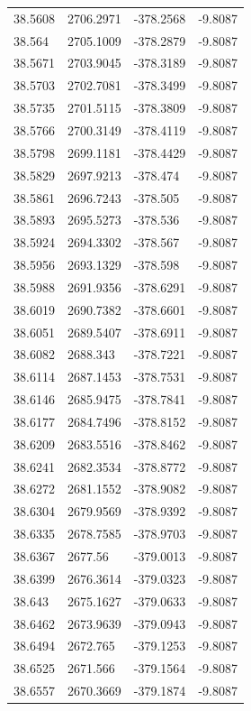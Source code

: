 \begin{table}[H]
\begin{tabular}{llll}
38.5608 & 2706.2971 & -378.2568 & -9.8087 \\
38.564 & 2705.1009 & -378.2879 & -9.8087 \\
38.5671 & 2703.9045 & -378.3189 & -9.8087 \\
38.5703 & 2702.7081 & -378.3499 & -9.8087 \\
38.5735 & 2701.5115 & -378.3809 & -9.8087 \\
38.5766 & 2700.3149 & -378.4119 & -9.8087 \\
38.5798 & 2699.1181 & -378.4429 & -9.8087 \\
38.5829 & 2697.9213 & -378.474 & -9.8087 \\
38.5861 & 2696.7243 & -378.505 & -9.8087 \\
38.5893 & 2695.5273 & -378.536 & -9.8087 \\
38.5924 & 2694.3302 & -378.567 & -9.8087 \\
38.5956 & 2693.1329 & -378.598 & -9.8087 \\
38.5988 & 2691.9356 & -378.6291 & -9.8087 \\
38.6019 & 2690.7382 & -378.6601 & -9.8087 \\
38.6051 & 2689.5407 & -378.6911 & -9.8087 \\
38.6082 & 2688.343 & -378.7221 & -9.8087 \\
38.6114 & 2687.1453 & -378.7531 & -9.8087 \\
38.6146 & 2685.9475 & -378.7841 & -9.8087 \\
38.6177 & 2684.7496 & -378.8152 & -9.8087 \\
38.6209 & 2683.5516 & -378.8462 & -9.8087 \\
38.6241 & 2682.3534 & -378.8772 & -9.8087 \\
38.6272 & 2681.1552 & -378.9082 & -9.8087 \\
38.6304 & 2679.9569 & -378.9392 & -9.8087 \\
38.6335 & 2678.7585 & -378.9703 & -9.8087 \\
38.6367 & 2677.56 & -379.0013 & -9.8087 \\
38.6399 & 2676.3614 & -379.0323 & -9.8087 \\
38.643 & 2675.1627 & -379.0633 & -9.8087 \\
38.6462 & 2673.9639 & -379.0943 & -9.8087 \\
38.6494 & 2672.765 & -379.1253 & -9.8087 \\
38.6525 & 2671.566 & -379.1564 & -9.8087 \\
38.6557 & 2670.3669 & -379.1874 & -9.8087 \\

\end{tabular}
\end{table}
